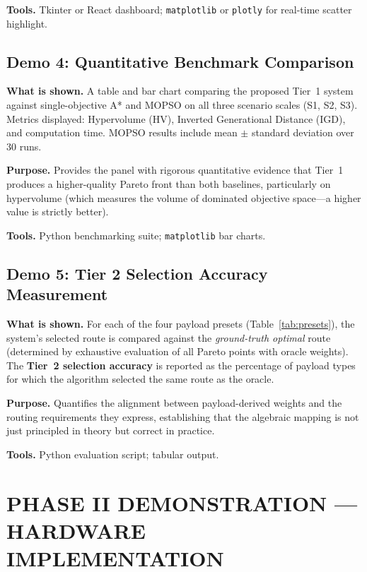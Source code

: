 \textbf{Tools.} Tkinter or React dashboard; \texttt{matplotlib} or \texttt{plotly} for
real-time scatter highlight.

\subsection{Demo 4: Quantitative Benchmark Comparison}

\textbf{What is shown.} A table and bar chart comparing the proposed Tier~1 system
against single-objective A* and MOPSO on all three scenario scales (S1, S2, S3).
Metrics displayed: Hypervolume (HV), Inverted Generational Distance (IGD), and
computation time. MOPSO results include mean $\pm$ standard deviation over 30 runs.

\textbf{Purpose.} Provides the panel with rigorous quantitative evidence that Tier~1
produces a higher-quality Pareto front than both baselines, particularly on hypervolume
(which measures the volume of dominated objective space---a higher value is strictly
better).

\textbf{Tools.} Python benchmarking suite; \texttt{matplotlib} bar charts.

\subsection{Demo 5: Tier 2 Selection Accuracy Measurement}

\textbf{What is shown.} For each of the four payload presets (Table~\ref{tab:presets}),
the system's selected route is compared against the \textit{ground-truth optimal} route
(determined by exhaustive evaluation of all Pareto points with oracle weights). The
\textbf{Tier~2 selection accuracy} is reported as the percentage of payload types for
which the algorithm selected the same route as the oracle.

\textbf{Purpose.} Quantifies the alignment between payload-derived weights and the
routing requirements they express, establishing that the algebraic mapping is not just
principled in theory but correct in practice.

\textbf{Tools.} Python evaluation script; tabular output.

\section{PHASE II DEMONSTRATION --- HARDWARE IMPLEMENTATION}
\label{sec:phase2demo}

